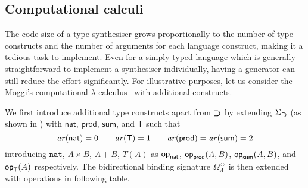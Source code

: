\subsection{Computational calculi}\label{subsec:PCF}
The code size of a type synthesiser grows proportionally to the number of type constructs and the number of arguments for each language construct, making it a tedious task to implement.
Even for a simply typed language which is generally straightforward to implement a synthesiser individually, having a generator can still reduce the effort significantly.
For illustrative purposes, let us consider the Moggi's computational $\lambda$-calculus~\cite{Moggi1989} with additional constructs.

We first introduce additional type constructs apart from $\mathbin{\bm{\supset}}$ by extending $\Sigma_{\mathbin{\bm{\supset}}}$ (as shown in ) with $\mathsf{nat}$, $\mathsf{prod}$, $\mathsf{sum}$, and $\mathsf{T}$ such that
\[
  \mathit{ar}({\mathsf{nat}}) = 0\qquad
  \mathit{ar}({\mathsf{T}}) = 1\qquad
  \mathit{ar}({\mathsf{prod}}) = \mathit{ar}({\mathsf{sum}}) = 2
\]
introducing $\mathtt{nat}$, $A \times B$, $A + B$, $T(A)$ as $\mathsf{op}_{\mathsf{nat}}$, $\mathsf{op}_{\mathsf{prod}}(A, B)$, $\mathsf{op}_{\mathsf{sum}}(A, B)$, and $\mathsf{op}_{\mathsf{T}}(A)$ respectively.
The bidirectional binding signature $\Omega_{\Lambda}^{\Leftrightarrow}$ is then extended with operations in following table.

